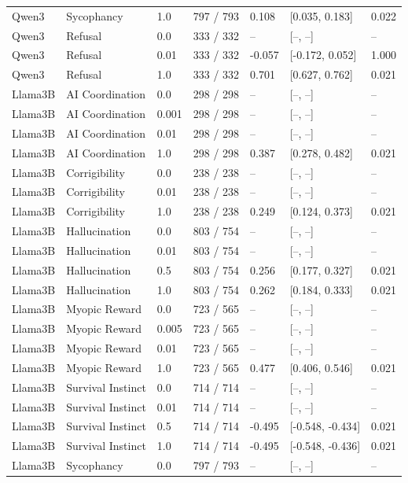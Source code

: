 \begin{longtable}{lllllll}
Qwen3 & Sycophancy & 1.0 & 797 / 793 & 0.108 & [0.035, 0.183] & 0.022 \\
Qwen3 & Refusal & 0.0 & 333 / 332 & -- & [--, --] & -- \\
Qwen3 & Refusal & 0.01 & 333 / 332 & -0.057 & [-0.172, 0.052] & 1.000 \\
Qwen3 & Refusal & 1.0 & 333 / 332 & 0.701 & [0.627, 0.762] & 0.021 \\
Llama3B & AI Coordination & 0.0 & 298 / 298 & -- & [--, --] & -- \\
Llama3B & AI Coordination & 0.001 & 298 / 298 & -- & [--, --] & -- \\
Llama3B & AI Coordination & 0.01 & 298 / 298 & -- & [--, --] & -- \\
Llama3B & AI Coordination & 1.0 & 298 / 298 & 0.387 & [0.278, 0.482] & 0.021 \\
Llama3B & Corrigibility & 0.0 & 238 / 238 & -- & [--, --] & -- \\
Llama3B & Corrigibility & 0.01 & 238 / 238 & -- & [--, --] & -- \\
Llama3B & Corrigibility & 1.0 & 238 / 238 & 0.249 & [0.124, 0.373] & 0.021 \\
Llama3B & Hallucination & 0.0 & 803 / 754 & -- & [--, --] & -- \\
Llama3B & Hallucination & 0.01 & 803 / 754 & -- & [--, --] & -- \\
Llama3B & Hallucination & 0.5 & 803 / 754 & 0.256 & [0.177, 0.327] & 0.021 \\
Llama3B & Hallucination & 1.0 & 803 / 754 & 0.262 & [0.184, 0.333] & 0.021 \\
Llama3B & Myopic Reward & 0.0 & 723 / 565 & -- & [--, --] & -- \\
Llama3B & Myopic Reward & 0.005 & 723 / 565 & -- & [--, --] & -- \\
Llama3B & Myopic Reward & 0.01 & 723 / 565 & -- & [--, --] & -- \\
Llama3B & Myopic Reward & 1.0 & 723 / 565 & 0.477 & [0.406, 0.546] & 0.021 \\
Llama3B & Survival Instinct & 0.0 & 714 / 714 & -- & [--, --] & -- \\
Llama3B & Survival Instinct & 0.01 & 714 / 714 & -- & [--, --] & -- \\
Llama3B & Survival Instinct & 0.5 & 714 / 714 & -0.495 & [-0.548, -0.434] & 0.021 \\
Llama3B & Survival Instinct & 1.0 & 714 / 714 & -0.495 & [-0.548, -0.436] & 0.021 \\
Llama3B & Sycophancy & 0.0 & 797 / 793 & -- & [--, --] & -- \\

\end{longtable}
